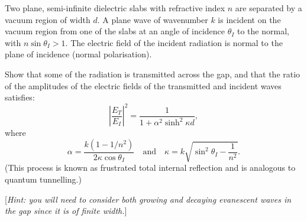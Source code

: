 Two plane, semi-infinite dielectric slabs with refractive index $n$ are separated by a vacuum region of width $d$. A plane wave of wavenumber $k$ is incident on the vacuum region from one of the slabs at an angle of incidence $\theta_I$ to the normal, with $n \sin \theta_I > 1$. The electric field of the incident radiation is normal to the plane of incidence (normal polarisation).

Show that some of the radiation is transmitted across the gap, and that the ratio of the amplitudes of the electric fields of the transmitted and incident waves satisfies:
\begin{equation}
\left| \frac{E_T}{E_I} \right|^2 = \frac{1}{1 + \alpha^2 \sinh^2 \kappa d},
\end{equation}
where
\begin{equation}
\alpha = \frac{k(1 - 1/n^2)}{2\kappa \cos \theta_I}
\quad \text{and} \quad
\kappa = k \sqrt{\sin^2 \theta_I - \frac{1}{n^2}}.
\end{equation}
(This process is known as frustrated total internal reflection and is analogous to quantum tunnelling.)

[\textit{Hint: you will need to consider both growing and decaying evanescent waves in the gap since it is of finite width.}]

